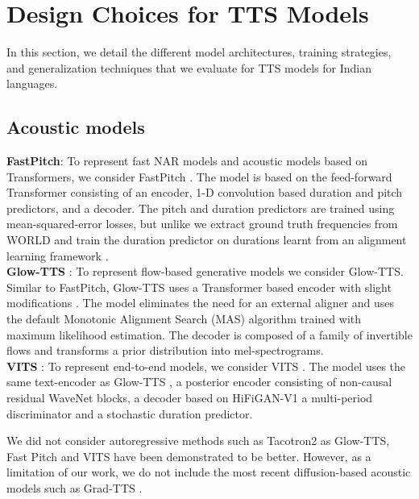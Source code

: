 \documentclass{article}
\begin{document}
\section{Design Choices for TTS Models}
\label{sec:design-choices}

In this section, we detail the different model architectures, training strategies, and generalization techniques that we evaluate for TTS models for Indian languages.
\subsection{Acoustic models}
\label{subsec:acoustic}


\textbf{FastPitch}\cite{lancucki2021fastpitch}: 
To represent fast NAR models and acoustic models based on Transformers, we consider FastPitch \cite{lancucki2021fastpitch}.
The model is based on the feed-forward Transformer consisting of an encoder, 1-D convolution based duration and pitch predictors, and a decoder. 
The pitch and duration predictors are trained using mean-squared-error losses, but unlike \cite{lancucki2021fastpitch} we extract ground truth frequencies from WORLD \cite{morise2016world} and train the duration predictor on durations learnt from an alignment learning framework \cite{badlani2022one}.\\
\textbf{Glow-TTS} \cite{kim2020glow}: 
To represent flow-based generative models we consider Glow-TTS. Similar to FastPitch, Glow-TTS uses a Transformer based encoder with slight modifications \cite{kim2020glow}. The model eliminates the need for an external aligner and uses the default Monotonic Alignment Search (MAS) algorithm trained with maximum likelihood estimation. The decoder is composed of a family of invertible flows and transforms a prior distribution into mel-spectrograms.\\
\textbf{VITS} \cite{kim2021conditional}: To represent end-to-end models, we consider VITS \cite{kim2020glow}. The model uses the same text-encoder as Glow-TTS \cite{kim2020glow}, a posterior encoder consisting of non-causal residual WaveNet blocks, a decoder based on HiFiGAN-V1 \cite{kong2020hifi} a multi-period discriminator and a stochastic duration predictor.

We did not consider autoregressive methods such as Tacotron2 as Glow-TTS, Fast Pitch and VITS have been demonstrated to be better. However, as a limitation of our work, we do not include the most recent diffusion-based acoustic models such as Grad-TTS \cite{popov2021grad}.
\end{document}
